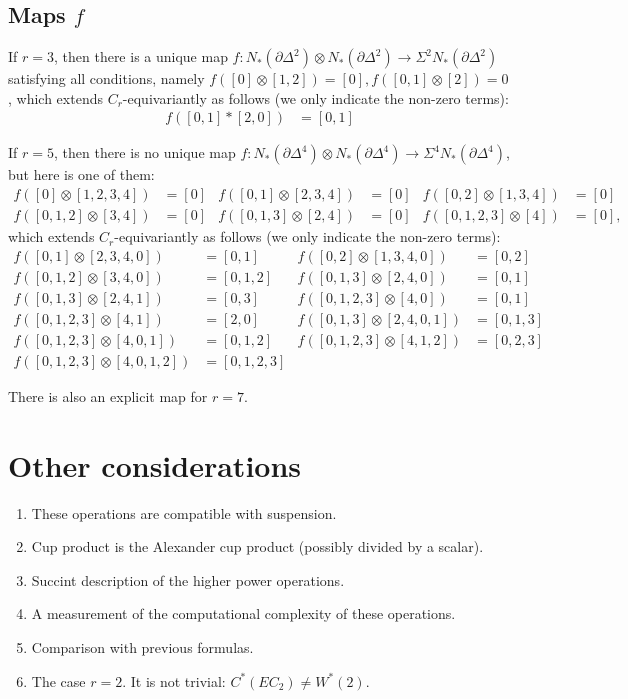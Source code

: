 	\subsection{Maps $f$}
	If $r=3$, then there is a unique map $f\colon N_*(\partial \Delta^2)\otimes N_*(\partial\Delta^2)\to \Sigma^2N_*(\partial\Delta^2)$ satisfying all conditions, namely $f([0]\otimes [1,2]) = [0], f([0,1]\otimes [2])=0$, which extends $C_r$-equivariantly as follows (we only indicate the non-zero terms):
	\begin{align*}
		f([0,1]*[2,0]) &= [0,1]
	\end{align*}

	If $r=5$, then there is no unique map $f\colon N_*(\partial \Delta^4)\otimes N_*(\partial \Delta^4)\to \Sigma^4N_*(\partial \Delta^4)$, but here is one of them:
	\begin{align*}
		f([0]\otimes[1,2,3,4]) &= [0] &
		f([0,1]\otimes [2,3,4]) &= [0] &
		f([0,2]\otimes [1,3,4]) &= [0] \\
		f([0,1,2]\otimes [3,4]) &= [0] &
		f([0,1,3]\otimes [2,4]) &= [0] &
		f([0,1,2,3]\otimes [4]) &= [0],
	\end{align*}
	which extends $C_r$-equivariantly as follows (we only indicate the non-zero terms):
	\begin{align*}
		f([0,1]\otimes [2,3,4,0]) &= [0,1] &
		f([0,2]\otimes [1,3,4,0]) &= [0,2] \\
		f([0,1,2]\otimes [3,4,0]) &= [0,1,2] &
		f([0,1,3]\otimes [2,4,0]) &= [0,1] \\
		f([0,1,3]\otimes [2,4,1]) &= [0,3] &
		f([0,1,2,3]\otimes [4,0]) &= [0,1] \\
		f([0,1,2,3]\otimes [4,1]) &= [2,0] &
		f([0,1,3]\otimes [2,4,0,1]) &= [0,1,3] \\
		f([0,1,2,3]\otimes [4,0,1]) &= [0,1,2] &
		f([0,1,2,3]\otimes [4,1,2]) &= [0,2,3] \\
		f([0,1,2,3]\otimes [4,0,1,2]) &= [0,1,2,3] &&
	\end{align*}

	There is also an explicit map for $r=7$.
	\section{Other considerations}
	\begin{enumerate}
		\item These operations are compatible with suspension.
		\item Cup product is the Alexander cup product (possibly divided by a scalar).
		\item Succint description of the higher power operations.
		\item A measurement of the computational complexity of these operations.
		\item Comparison with previous formulas.
		\item The case $r=2$. It is not trivial: $C^*(EC_2)\neq W^*(2)$.
	\end{enumerate}


